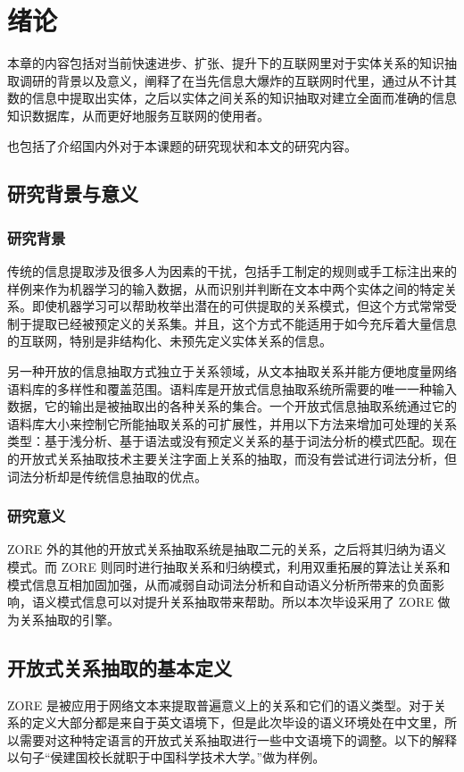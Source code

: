 \chapter{绪论}
\label{chap:introduction}

本章的内容包括对当前快速进步、扩张、提升下的互联网里对于实体关系的知识抽取调研的背景以及意义，阐释了在当先信息大爆炸的互联网时代里，通过从不计其数的信息中提取出实体，之后以实体之间关系的知识抽取对建立全面而准确的信息知识数据库，从而更好地服务互联网的使用者。

也包括了介绍国内外对于本课题的研究现状和本文的研究内容。

\section{研究背景与意义}

\subsection{研究背景}

传统的信息提取涉及很多人为因素的干扰，包括手工制定的规则或手工标注出来的样例来作为机器学习的输入数据，从而识别并判断在文本中两个实体之间的特定关系\citep{wang}。即使机器学习可以帮助枚举出潜在的可供提取的关系模式，但这个方式常常受制于提取已经被预定义的关系集。并且，这个方式不能适用于如今充斥着大量信息的互联网，特别是非结构化、未预先定义实体关系的信息。

另一种开放的信息抽取\citep{banko}方式独立于关系领域，从文本抽取关系并能方便地度量网络语料库的多样性和覆盖范围。语料库是开放式信息抽取系统所需要的唯一一种输入数据，它的输出是被抽取出的各种关系的集合。一个开放式信息抽取系统通过它的语料库大小来控制它所能抽取关系的可扩展性，并用以下方法来增加可处理的关系类型：基于浅分析、基于语法或没有预定义关系的基于词法分析的模式匹配\citep{wu2010, naka2012, etz2011}。现在的开放式关系抽取技术主要关注字面上关系的抽取，而没有尝试进行词法分析，但词法分析却是传统信息抽取的优点。

\subsection{研究意义}
ZORE 外的其他的开放式关系抽取系统是抽取二元的关系，之后将其归纳为语义模式。而 ZORE 则同时进行抽取关系和归纳模式，利用双重拓展的算法让关系和模式信息互相加固加强，从而减弱自动词法分析和自动语义分析所带来的负面影响，语义模式信息可以对提升关系抽取带来帮助。所以本次毕设采用了 ZORE 做为关系抽取的引擎。

\section{开放式关系抽取的基本定义}
ZORE 是被应用于网络文本来提取普遍意义上的关系和它们的语义类型。对于关系的定义大部分都是来自于英文语境下，但是此次毕设的语义环境处在中文里，所以需要对这种特定语言的开放式关系抽取进行一些中文语境下的调整。以下的解释以句子“侯建国校长就职于中国科学技术大学。”做为样例。

